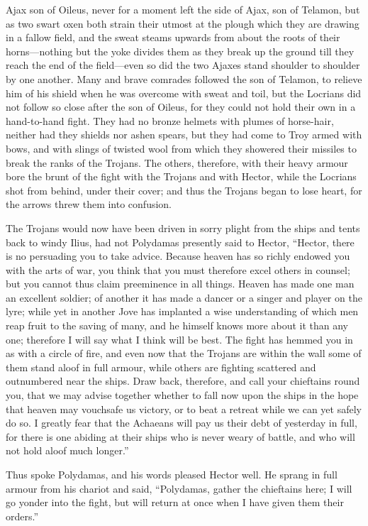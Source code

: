 Ajax son of Oileus, never for a moment left the side of Ajax, son of
Telamon, but as two swart oxen both strain their utmost at the plough
which they are drawing in a fallow field, and the sweat steams upwards
from about the roots of their horns—nothing but the yoke divides
them as they break up the ground till they reach the end of the field—even
so did the two Ajaxes stand shoulder to shoulder by one another. Many and
brave comrades followed the son of Telamon, to relieve him of his shield
when he was overcome with sweat and toil, but the Locrians did not follow
so close after the son of Oileus, for they could not hold their own in a
hand-to-hand fight. They had no bronze helmets with plumes of horse-hair,
neither had they shields nor ashen spears, but they had come to Troy armed
with bows, and with slings of twisted wool from which they showered their
missiles to break the ranks of the Trojans. The others, therefore, with
their heavy armour bore the brunt of the fight with the Trojans and with
Hector, while the Locrians shot from behind, under their cover; and thus
the Trojans began to lose heart, for the arrows threw them into confusion.

The Trojans would now have been driven in sorry plight from the ships and
tents back to windy Ilius, had not Polydamas presently said to Hector,
“Hector, there is no persuading you to take advice. Because heaven has so
richly endowed you with the arts of war, you think that you must therefore
excel others in counsel; but you cannot thus claim preeminence in all
things. Heaven has made one man an excellent soldier; of another it has
made a dancer or a singer and player on the lyre; while yet in another
Jove has implanted a wise understanding of which men reap fruit to the
saving of many, and he himself knows more about it than any one; therefore
I will say what I think will be best. The fight has hemmed you in as with
a circle of fire, and even now that the Trojans are within the wall some
of them stand aloof in full armour, while others are fighting scattered
and outnumbered near the ships. Draw back, therefore, and call your
chieftains round you, that we may advise together whether to fall now upon
the ships in the hope that heaven may vouchsafe us victory, or to beat a
retreat while we can yet safely do so. I greatly fear that the Achaeans
will pay us their debt of yesterday in full, for there is one abiding at
their ships who is never weary of battle, and who will not hold aloof much
longer.”

Thus spoke Polydamas, and his words pleased Hector well. He sprang in full
armour from his chariot and said, “Polydamas, gather the chieftains here;
I will go yonder into the fight, but will return at once when I have given
them their orders.”

